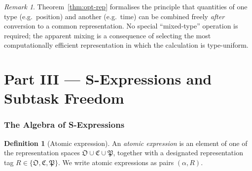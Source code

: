 \documentclass[11pt,a4paper]{article}
\theoremstyle{thmstyle}
\theoremstyle{thmstyle}
\theoremstyle{definition}
\newtheorem{definition}[theorem]{Definition}
\theoremstyle{remark}
\newtheorem{remark}[theorem]{Remark}
\newcommand{\Osc}{\mathfrak{O}}
\newcommand{\Cat}{\mathfrak{C}}
\newcommand{\Part}{\mathfrak{P}}
\newcommand{\Cat}{\mathfrak{C}}
\begin{document}
\begin{remark}\label{rem:apples-oranges}
Theorem~\ref{thm:opt-rep} formalises the principle that
quantities of one type (e.g.\ position) and another
(e.g.\ time) can be combined freely \emph{after}
conversion to a common representation.  No special
``mixed-type'' operation is required; the apparent
mixing is a consequence of selecting the most
computationally efficient representation in which the
calculation is type-uniform.
\end{remark}

\clearpage

\part*{Part III --- S-Expressions and Subtask Freedom}

\section{The Algebra of S-Expressions}
\label{sec:s-expressions}

\begin{definition}[Atomic expression]\label{def:atomic}
An \emph{atomic expression} is an element of one of the
representation spaces $\Osc \cup \Cat \cup \Part$,
together with a designated representation tag
$R \in \{\mathfrak{O}, \mathfrak{C}, \mathfrak{P}\}$.
We write atomic expressions as pairs $(\alpha, R)$.
\end{definition}
\end{document}
